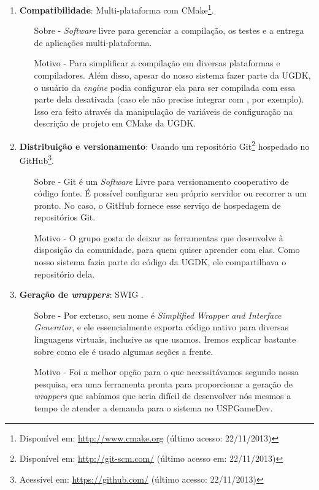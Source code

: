 \begin{enumerate}
    \item \textbf{Compatibilidade}: Multi-plataforma com CMake\footnote{Disponível
      em: \url{http://www.cmake.org} (último acesso: 22/11/2013)}.
      \begin{itemize}
        \item[Sobre -] \textit{Software} livre para gerenciar a compilação, os testes
          e a entrega de aplicações multi-plataforma.
        \item[Motivo -] Para simplificar a compilação em diversas plataformas e
          compiladores. Além disso, apesar do nosso sistema fazer parte
          da UGDK, o usuário da \textit{engine} podia configurar ela para ser
          compilada com essa parte dela desativada (caso ele não precise integrar
          com , por exemplo). Isso era feito através da manipulação de
          variáveis de configuração na descrição de projeto em CMake da UGDK.
      \end{itemize}

    \item \textbf{Distribuição e versionamento}: Usando um repositório
      Git\footnote{Disponível em: \url{http://git-scm.com/} (último acesso em: 22/11/2013)}
      hospedado no GitHub\footnote{ Acessível em: \url{https://github.com/} (último
      acesso: 22/11/2013)}.
      \begin{itemize}
        \item[Sobre -] Git é um \textit{Software} Livre para versionamento cooperativo
          de código fonte. É possível configurar seu próprio servidor ou recorrer a um
          pronto. No caso, o GitHub fornece esse serviço de hospedagem de repositórios Git.
        \item[Motivo -] O grupo gosta de deixar as ferramentas que desenvolve à
          disposição da comunidade, para quem quiser aprender com elas. Como nosso
          sistema fazia parte do código da UGDK, ele compartilhava o repositório dela.
      \end{itemize}

    \item \textbf{Geração de \textit{wrappers}}: SWIG \cite{swig:00}.
      \begin{itemize}
        \item[Sobre -] Por extenso, seu nome é \emph{Simplified Wrapper and
          Interface Generator}, e ele essencialmente exporta código nativo
          para diversas linguagens virtuais, inclusive as que usamos. Iremos explicar
          bastante sobre como ele é usado algumas seções a frente.
        \item[Motivo -] Foi a melhor opção para o que necessitávamos segundo
          nossa pesquisa, era uma ferramenta pronta para proporcionar a
          geração de \textit{wrappers} que sabíamos que seria difícil de
          desenvolver nós mesmos a tempo de atender a demanda para o sistema
          no USPGameDev.
      \end{itemize}


\end{enumerate}
